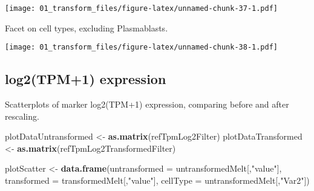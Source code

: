 \documentclass[
]{article}
\newenvironment{Shaded}{\begin{snugshade}}{\end{snugshade}}
\newcommand{\AttributeTok}[1]{\textcolor[rgb]{0.13,0.29,0.53}{#1}}
\newcommand{\DecValTok}[1]{\textcolor[rgb]{0.00,0.00,0.81}{#1}}
\newcommand{\FunctionTok}[1]{\textcolor[rgb]{0.13,0.29,0.53}{\textbf{#1}}}
\newcommand{\NormalTok}[1]{#1}
\newcommand{\OtherTok}[1]{\textcolor[rgb]{0.56,0.35,0.01}{#1}}
\newcommand{\SpecialCharTok}[1]{\textcolor[rgb]{0.81,0.36,0.00}{\textbf{#1}}}
\newcommand{\StringTok}[1]{\textcolor[rgb]{0.31,0.60,0.02}{#1}}
\begin{document}
\texttt{[image: 01\_transform\_files/figure-latex/unnamed-chunk-37-1.pdf]}

Facet on cell types, excluding Plasmablasts.

\begin{Shaded}
\end{Shaded}

\texttt{[image: 01\_transform\_files/figure-latex/unnamed-chunk-38-1.pdf]}

\hypertarget{log2tpm1-expression}{%
\subsection{log2(TPM+1) expression}\label{log2tpm1-expression}}

Scatterplots of marker log2(TPM+1) expression, comparing before and
after rescaling.

\begin{Shaded}
\begin{Highlighting}[]
\NormalTok{plotDataUntransformed }\OtherTok{\textless{}{-}} \FunctionTok{as.matrix}\NormalTok{(refTpmLog2Filter)}
\NormalTok{plotDataTransformed }\OtherTok{\textless{}{-}} \FunctionTok{as.matrix}\NormalTok{(refTpmLog2TransformedFilter)}
\end{Highlighting}
\end{Shaded}

\begin{Shaded}
\begin{Highlighting}[]
\NormalTok{plotScatter }\OtherTok{\textless{}{-}} \FunctionTok{data.frame}\NormalTok{(}\AttributeTok{untransformed =}\NormalTok{ untransformedMelt[,}\StringTok{"value"}\NormalTok{],}
                          \AttributeTok{transformed =}\NormalTok{ transformedMelt[,}\StringTok{"value"}\NormalTok{],}
                          \AttributeTok{cellType =}\NormalTok{ untransformedMelt[,}\StringTok{"Var2"}\NormalTok{])}
\end{Highlighting}
\end{Shaded}
\end{document}
